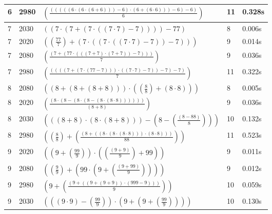 \documentclass{article}
\theoremstyle{nonumberplain}
\begin{document}
\begin{center}
\begin{longtable}{ | l | l | p{9.5cm} | l | l | }
            6 & 2980 & \( \left(\frac{\left(\left(\left(\left(\left(6 \cdot \left(6 \cdot \left(6 + 6\right)\right)\right) - 6\right) \cdot \left(6 + \left(6 \cdot 6\right)\right)\right) - 6\right) - 6\right)}{6}\right) \) & 11 & 0.328s \\\hline
            7 & 2030 & \( \left(\left(7 \cdot \left(7 + \left(7 \cdot \left(\left(7 \cdot 7\right) - 7\right)\right)\right)\right) - 77\right) \) & 8 & 0.006s \\\hline
            7 & 2020 & \( \left(\left(\frac{77}{7}\right) + \left(7 \cdot \left(\left(7 \cdot \left(\left(7 \cdot 7\right) - 7\right)\right) - 7\right)\right)\right) \) & 9 & 0.014s \\\hline
            7 & 2080 & \( \left(\frac{\left(7 + \left(77 \cdot \left(\left(\left(7 + 7\right) \cdot \left(7 + 7\right)\right) - 7\right)\right)\right)}{7}\right) \) & 9 & 0.036s \\\hline
            7 & 2980 & \( \left(\frac{\left(\left(\left(\left(7 + \left(7 \cdot \left(77 - 7\right)\right)\right) \cdot \left(\left(7 \cdot 7\right) - 7\right)\right) - 7\right) - 7\right)}{7}\right) \) & 11 & 0.322s \\\hline
            8 & 2080 & \( \left(\left(8 + \left(8 + \left(8 + 8\right)\right)\right) \cdot \left(\left(\frac{8}{8}\right) + \left(8 \cdot 8\right)\right)\right) \) & 8 & 0.005s \\\hline
            8 & 2020 & \( \left(\frac{\left(8 \cdot \left(8 - \left(8 \cdot \left(8 - \left(8 \cdot \left(8 \cdot 8\right)\right)\right)\right)\right)\right)}{\left(8 + 8\right)}\right) \) & 9 & 0.036s \\\hline
            8 & 2030 & \( \left(\left(\left(8 + 8\right) \cdot \left(8 \cdot \left(8 + 8\right)\right)\right) - \left(8 - \left(\frac{\left(8 - 88\right)}{8}\right)\right)\right) \) & 10 & 0.132s \\\hline
            8 & 2980 & \( \left(\left(\frac{8}{8}\right) + \left(\frac{\left(8 + \left(\left(8 \cdot \left(8 \cdot \left(8 \cdot 8\right)\right)\right) \cdot \left(8 \cdot 8\right)\right)\right)}{88}\right)\right) \) & 11 & 0.523s \\\hline
            9 & 2020 & \( \left(\left(9 + \left(\frac{99}{9}\right)\right) \cdot \left(\left(\frac{\left(9 + 9\right)}{9}\right) + 99\right)\right) \) & 9 & 0.011s \\\hline
            9 & 2080 & \( \left(\left(\frac{9}{9}\right) + \left(99 \cdot \left(9 + \left(\frac{\left(9 + 99\right)}{9}\right)\right)\right)\right) \) & 9 & 0.012s \\\hline
            9 & 2980 & \( \left(9 + \left(\frac{\left(9 + \left(\left(9 + \left(9 + 9\right)\right) \cdot \left(999 - 9\right)\right)\right)}{9}\right)\right) \) & 10 & 0.059s \\\hline
            9 & 2030 & \( \left(\left(\left(9 \cdot 9\right) - \left(\frac{99}{9}\right)\right) \cdot \left(9 + \left(9 + \left(\frac{99}{9}\right)\right)\right)\right) \) & 10 & 0.130s \\\hline
    \end{longtable}
\end{center}
\end{document}
